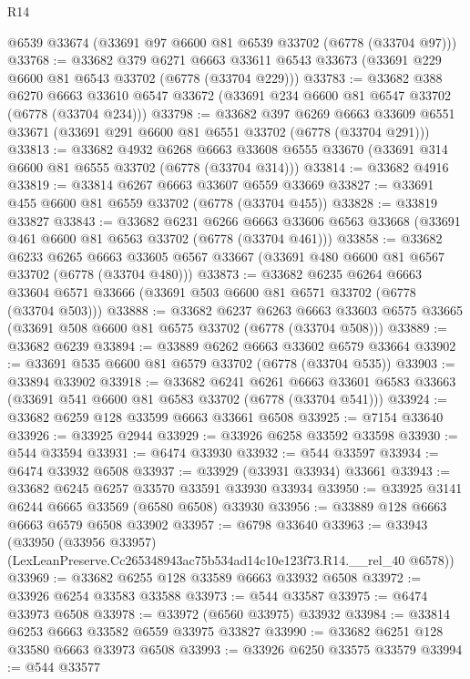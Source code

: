 \begin{lexlean}{R14}
\begin{coremodule}
    @6539
    @33674
    (@33691 @97 @6600 @81 @6539 @33702 (@6778 (@33704 @97)))
@33768 := @33682
    @379
    @6271
    @6663
    @33611
    @6543
    @33673
    (@33691 @229 @6600 @81 @6543 @33702 (@6778 (@33704 @229)))
@33783 := @33682
    @388
    @6270
    @6663
    @33610
    @6547
    @33672
    (@33691 @234 @6600 @81 @6547 @33702 (@6778 (@33704 @234)))
@33798 := @33682
    @397
    @6269
    @6663
    @33609
    @6551
    @33671
    (@33691 @291 @6600 @81 @6551 @33702 (@6778 (@33704 @291)))
@33813 := @33682
    @4932
    @6268
    @6663
    @33608
    @6555
    @33670
    (@33691 @314 @6600 @81 @6555 @33702 (@6778 (@33704 @314)))
@33814 := @33682 @4916
@33819 := @33814 @6267 @6663 @33607 @6559 @33669
@33827 := @33691 @455 @6600 @81 @6559 @33702 (@6778 (@33704 @455))
@33828 := @33819 @33827
@33843 := @33682
    @6231
    @6266
    @6663
    @33606
    @6563
    @33668
    (@33691 @461 @6600 @81 @6563 @33702 (@6778 (@33704 @461)))
@33858 := @33682
    @6233
    @6265
    @6663
    @33605
    @6567
    @33667
    (@33691 @480 @6600 @81 @6567 @33702 (@6778 (@33704 @480)))
@33873 := @33682
    @6235
    @6264
    @6663
    @33604
    @6571
    @33666
    (@33691 @503 @6600 @81 @6571 @33702 (@6778 (@33704 @503)))
@33888 := @33682
    @6237
    @6263
    @6663
    @33603
    @6575
    @33665
    (@33691 @508 @6600 @81 @6575 @33702 (@6778 (@33704 @508)))
@33889 := @33682 @6239
@33894 := @33889 @6262 @6663 @33602 @6579 @33664
@33902 := @33691 @535 @6600 @81 @6579 @33702 (@6778 (@33704 @535))
@33903 := @33894 @33902
@33918 := @33682
    @6241
    @6261
    @6663
    @33601
    @6583
    @33663
    (@33691 @541 @6600 @81 @6583 @33702 (@6778 (@33704 @541)))
@33924 := @33682 @6259 @128 @33599 @6663 @33661 @6508
@33925 := @7154 @33640
@33926 := @33925 @2944
@33929 := @33926 @6258 @33592 @33598
@33930 := @544 @33594
@33931 := @6474 @33930
@33932 := @544 @33597
@33934 := @6474 @33932 @6508
@33937 := @33929 (@33931 @33934) @33661
@33943 := @33682 @6245 @6257 @33570 @33591 @33930 @33934
@33950 := @33925 @3141 @6244 @6665 @33569 (@6580 @6508) @33930
@33956 := @33889 @128 @6663 @6663 @6579 @6508 @33902
@33957 := @6798 @33640
@33963 := @33943
    (@33950 (@33956 @33957) (LexLeanPreserve.Cc265348943ac75b534ad14c10e123f73.R14.__rel_40 @6578))
@33969 := @33682 @6255 @128 @33589 @6663 @33932 @6508
@33972 := @33926 @6254 @33583 @33588
@33973 := @544 @33587
@33975 := @6474 @33973 @6508
@33978 := @33972 (@6560 @33975) @33932
@33984 := @33814 @6253 @6663 @33582 @6559 @33975 @33827
@33990 := @33682 @6251 @128 @33580 @6663 @33973 @6508
@33993 := @33926 @6250 @33575 @33579
@33994 := @544 @33577

\end{coremodule}
\end{lexlean}
